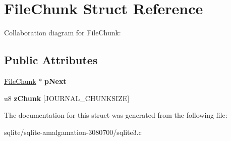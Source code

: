 \hypertarget{struct_file_chunk}{\section{File\+Chunk Struct Reference}
\label{struct_file_chunk}
}


Collaboration diagram for File\+Chunk\+:
\subsection*{Public Attributes}
\begin{DoxyCompactItemize}
\item 
\hypertarget{struct_file_chunk_ad2d0d170afc7ce1e239e8716852e247b}{\hyperlink{struct_file_chunk}{File\+Chunk} $\ast$ {\bfseries p\+Next}}\label{struct_file_chunk_ad2d0d170afc7ce1e239e8716852e247b}

\item 
\hypertarget{struct_file_chunk_ada06a9958ee6b82a6c2b15c29f847d19}{u8 {\bfseries z\+Chunk} \mbox{[}J\+O\+U\+R\+N\+A\+L\+\_\+\+C\+H\+U\+N\+K\+S\+I\+Z\+E\mbox{]}}\label{struct_file_chunk_ada06a9958ee6b82a6c2b15c29f847d19}

\end{DoxyCompactItemize}


The documentation for this struct was generated from the following file\+:\begin{DoxyCompactItemize}
\item 
sqlite/sqlite-\/amalgamation-\/3080700/sqlite3.\+c\end{DoxyCompactItemize}
